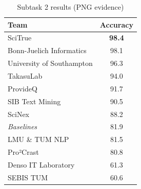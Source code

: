 \begin{table}[ht]
\centering
\small
\caption{Subtask 2 results (PNG evidence)}
\label{tab:subtask2_png}
\begin{tabular}{lc}
\toprule
Team & Accuracy \\
\midrule
SciTrue & \textbf{98.4} \\
Bonn-Juelich Informatics & 98.1 \\
University of Southampton & 96.3 \\
TakasuLab & 94.0 \\
ProvideQ & 91.7 \\
SIB Text Mining & 90.5 \\
SciNex & 88.2 \\
\textit{Baselines} & 81.9 \\
LMU \& TUM NLP & 81.5 \\
Pro²Crast & 80.8 \\
Denso IT Laboratory & 61.3 \\
SEBIS TUM & 60.6 \\
\bottomrule
\end{tabular}
\end{table}
